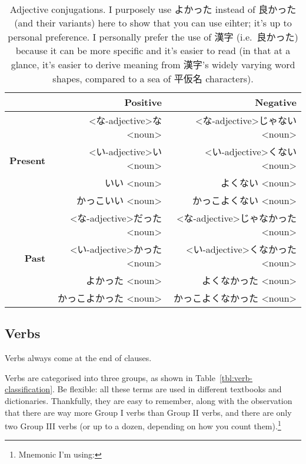 \documentclass[../nihongo-gakushuu-kyouzai.tex]{subfiles}
\begin{document}
\begin{table}[h]
\centering
\begin{tabular}{@{}rrr@{}}
    \toprule
    & \textbf{Positive} & \textbf{Negative} \\ \midrule
    \multirow{4}{*}{\textbf{Present}} & <な-adjective>な<noun> & <な-adjective>じゃない<noun> \\
    & <い-adjective>い <noun> & <い-adjective>くない <noun> \\
    & いい <noun> & よくない <noun> \\
    & かっこいい <noun> & かっこよくない <noun> \\
    \midrule
    \multirow{4}{*}{\textbf{Past}} &  <な-adjective>だった<noun> &  <な-adjective>じゃなかった<noun> \\
    & <い-adjective>かった <noun> & <い-adjective>くなかった <noun> \\
    & よかった <noun> & よくなかった <noun> \\
    & かっこよかった <noun> & かっこよくなかった <noun> \\ \bottomrule
\end{tabular}%
\caption{Adjective conjugations. I purposely use よかった instead of 良かった (and their variants) here to show that you can use eihter; it's up to personal preference. I personally prefer the use of 漢字 (i.e.\ 良かった) because it can be more specific and it's easier to read (in that at a glance, it's easier to derive meaning from 漢字's widely varying word shapes, compared to a sea of 平仮名 characters). }
\label{tbl:adjective-conjugations}
\end{table}

\subsection{Verbs}
Verbs always come at the end of clauses.

Verbs are categorised into three groups, as shown in Table~\ref{tbl:verb-classification}. Be flexible: all these terms are used in different textbooks and dictionaries. Thankfully, they are easy to remember, along with the observation that there are way more Group I verbs than Group II verbs, and there are only two Group III verbs (or up to a dozen, depending on how you count them).\footnote{Mnemonic I'm using: }
\end{document}
